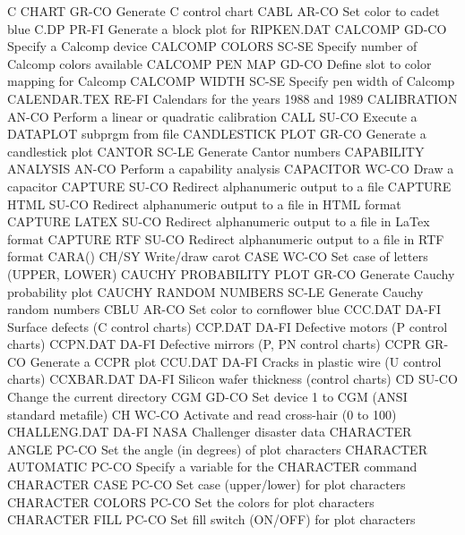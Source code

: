 C CHART                     GR-CO Generate C control chart
CABL                        AR-CO Set color to cadet blue
C.DP                        PR-FI Generate a block plot for RIPKEN.DAT
CALCOMP                     GD-CO Specify a Calcomp device
CALCOMP COLORS              SC-SE Specify number of Calcomp colors available
CALCOMP PEN MAP             GD-CO Define slot to color mapping for Calcomp
CALCOMP WIDTH               SC-SE Specify pen width of Calcomp
CALENDAR.TEX                RE-FI Calendars for the years 1988 and 1989
CALIBRATION                 AN-CO Perform a linear or quadratic calibration
CALL                        SU-CO Execute a DATAPLOT subprgm from file
CANDLESTICK PLOT            GR-CO Generate a candlestick plot
CANTOR                      SC-LE Generate Cantor numbers
CAPABILITY ANALYSIS         AN-CO Perform a capability analysis
CAPACITOR                   WC-CO Draw a capacitor
CAPTURE                     SU-CO Redirect alphanumeric output to a file
CAPTURE HTML                SU-CO Redirect alphanumeric output to a file in HTML format
CAPTURE LATEX               SU-CO Redirect alphanumeric output to a file in LaTex format
CAPTURE RTF                 SU-CO Redirect alphanumeric output to a file in RTF format
CARA()                      CH/SY Write/draw carot
CASE                        WC-CO Set case of letters (UPPER, LOWER)
CAUCHY PROBABILITY PLOT     GR-CO Generate Cauchy probability plot
CAUCHY RANDOM NUMBERS       SC-LE Generate Cauchy random numbers
CBLU                        AR-CO Set color to cornflower blue
CCC.DAT                     DA-FI Surface defects (C control charts)
CCP.DAT                     DA-FI Defective motors (P control charts)
CCPN.DAT                    DA-FI Defective mirrors (P, PN control charts)
CCPR                        GR-CO Generate a CCPR plot 
CCU.DAT                     DA-FI Cracks in plastic wire (U control charts)
CCXBAR.DAT                  DA-FI Silicon wafer thickness (control charts)
CD                          SU-CO Change the current directory
CGM                         GD-CO Set device 1 to CGM (ANSI standard metafile)
CH                          WC-CO Activate and read cross-hair (0 to 100)
CHALLENG.DAT                DA-FI NASA Challenger disaster data 
CHARACTER ANGLE             PC-CO Set the angle (in degrees) of plot characters
CHARACTER AUTOMATIC         PC-CO Specify a variable for the CHARACTER command
CHARACTER CASE              PC-CO Set case (upper/lower) for plot characters
CHARACTER COLORS            PC-CO Set the colors for plot characters
CHARACTER FILL              PC-CO Set fill switch (ON/OFF) for plot characters
